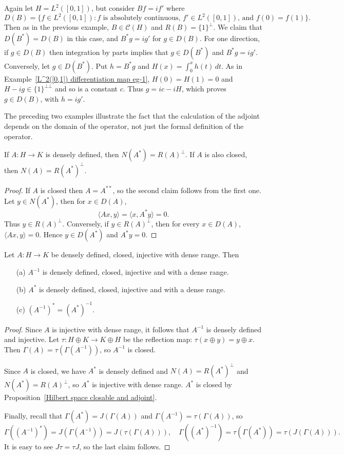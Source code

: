 \begin{example}\label{L^2([0,1]) differentiation map eg-2}
Again let $H=L^2([0,1])$, but consider $Bf=if'$ where
\[D(B)=\{f\in L^2([0,1]):\text{$f$ is absolutely
continuous, $f'\in L^2([0,1])$, and $f(0)=f(1)$}\}.\]
Then as in the previous example, $B\in\mathcal{C}(H)$ and $R(B)=\{1\}^\bot$. We claim that $D(B^*)=D(B)$ in this case, and $B^*g=ig'$ for $g\in D(B)$. For one direction, if $g\in D(B)$ then integration by parts implies that $g\in D(B^*)$ and $B^*g=ig'$. Conversely, let $g\in D(B^*)$. Put $h=B^*g$ and $H(x)=\int_0^xh(t)\,dt$. As in Example~\ref{L^2([0,1]) differentiation map eg-1}, $H(0)=H(1)=0$ and $H-ig\in\{1\}^{\bot\bot}$ and so is a constant $c$. Thus $g=ic-iH$, which proves $g\in D(B)$, with $h=ig'$.
\end{example}
The preceding two examples illustrate the fact that the calculation of the adjoint depends on the domain of the operator, not just the formal definition of the operator.
\begin{proposition}\label{Hilbert space unbounded kernel and adjoint}
If $A:H\to K$ is densely defined, then $N(A^*)=R(A)^\bot$. If $A$ is also closed, then $N(A)=R(A^*)^\bot$. 
\end{proposition}
\begin{proof}
If $A$ is closed then $A=A^{**}$, so the second claim follows from the first one. Let $y\in N(A^*)$, then for $x\in D(A)$,
\[\langle Ax,y\rangle=\langle x,A^*y\rangle=0.\]
Thus $y\in R(A)^\bot$. Conversely, if $y\in R(A)^\bot$, then for every $x\in D(A)$, $\langle Ax,y\rangle=0$. Hence $y\in D(A^*)$ and $A^*y=0$.
\end{proof}
\begin{proposition}\label{Hilbert space unbounded inverse and adjoint}
Let $A:H\to K$ be densely defined, closed, injective with dense range. Then
\begin{itemize}
\item[(a)] $A^{-1}$ is densely defined, closed, injective and with a dense range.
\item[(b)] $A^*$ is densely defined, closed, injective and with a dense range.
\item[(c)] $(A^{-1})^*=(A^*)^{-1}$.
\end{itemize}
\end{proposition}
\begin{proof}
Since $A$ is injective with dense range, it follows that $A^{-1}$ is densely defined and injective. Let $\tau:H\oplus K\to K\oplus H$ be the reflection map: $\tau(x\oplus y)=y\oplus x$. Then $\Gamma(A)=\tau(\Gamma(A^{-1}))$, so $A^{-1}$ is closed.\par
Since $A$ is closed, we have $A^*$ is densely defined and $N(A)=R(A^*)^\bot$ and $N(A^*)=R(A)^\bot$, so $A^*$ is injective with dense range. $A^*$ is closed by Proposition~\ref{Hilbert space closable and adjoint}.\par
Finally, recall that $\Gamma(A^*)=J(\Gamma(A))$ and $\Gamma(A^{-1})=\tau(\Gamma(A))$, so
\[\Gamma((A^{-1})^*)=J(\Gamma(A^{-1}))=J(\tau(\Gamma(A))),\quad\Gamma((A^*)^{-1})=\tau(\Gamma(A^*))=\tau(J(\Gamma(A))).\]
It is easy to see $J\tau=\tau J$, so the last claim follows.
\end{proof}
